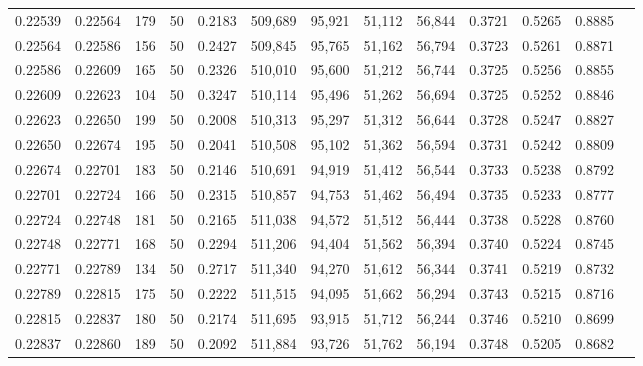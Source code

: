 \begin{tabular}{rrrrrrrrrrrrr}
0.22539 & 0.22564 &   179 &  50 &                                     0.2183 & 509,689 &  95,921 &  51,112 &  56,844 & 0.3721 & 0.5265 & 0.8885 \\
0.22564 & 0.22586 &   156 &  50 &                                     0.2427 & 509,845 &  95,765 &  51,162 &  56,794 & 0.3723 & 0.5261 & 0.8871 \\
0.22586 & 0.22609 &   165 &  50 &                                     0.2326 & 510,010 &  95,600 &  51,212 &  56,744 & 0.3725 & 0.5256 & 0.8855 \\
0.22609 & 0.22623 &   104 &  50 &                                     0.3247 & 510,114 &  95,496 &  51,262 &  56,694 & 0.3725 & 0.5252 & 0.8846 \\
0.22623 & 0.22650 &   199 &  50 &                                     0.2008 & 510,313 &  95,297 &  51,312 &  56,644 & 0.3728 & 0.5247 & 0.8827 \\
0.22650 & 0.22674 &   195 &  50 &                                     0.2041 & 510,508 &  95,102 &  51,362 &  56,594 & 0.3731 & 0.5242 & 0.8809 \\
0.22674 & 0.22701 &   183 &  50 &                                     0.2146 & 510,691 &  94,919 &  51,412 &  56,544 & 0.3733 & 0.5238 & 0.8792 \\
0.22701 & 0.22724 &   166 &  50 &                                     0.2315 & 510,857 &  94,753 &  51,462 &  56,494 & 0.3735 & 0.5233 & 0.8777 \\
0.22724 & 0.22748 &   181 &  50 &                                     0.2165 & 511,038 &  94,572 &  51,512 &  56,444 & 0.3738 & 0.5228 & 0.8760 \\
0.22748 & 0.22771 &   168 &  50 &                                     0.2294 & 511,206 &  94,404 &  51,562 &  56,394 & 0.3740 & 0.5224 & 0.8745 \\
0.22771 & 0.22789 &   134 &  50 &                                     0.2717 & 511,340 &  94,270 &  51,612 &  56,344 & 0.3741 & 0.5219 & 0.8732 \\
0.22789 & 0.22815 &   175 &  50 &                                     0.2222 & 511,515 &  94,095 &  51,662 &  56,294 & 0.3743 & 0.5215 & 0.8716 \\
0.22815 & 0.22837 &   180 &  50 &                                     0.2174 & 511,695 &  93,915 &  51,712 &  56,244 & 0.3746 & 0.5210 & 0.8699 \\
0.22837 & 0.22860 &   189 &  50 &                                     0.2092 & 511,884 &  93,726 &  51,762 &  56,194 & 0.3748 & 0.5205 & 0.8682 \\

\end{tabular}
